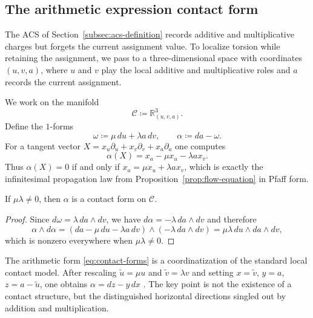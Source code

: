 
\subsection{The arithmetic expression contact form}\label{subsec:contact-form}

The ACS of Section~\ref{subsec:acs-definition} records additive and multiplicative charges but forgets the current assignment value. To localize torsion while retaining the assignment, we pass to a three-dimensional space with coordinates $(u,v,a)$, where $u$ and $v$ play the local additive and multiplicative roles and $a$ records the current assignment.

We work on the manifold
\[
\mathcal{C}\coloneqq \mathbb{R}^3_{(u,v,a)}.
\]
Define the $1$-forms
\begin{equation}\label{eq:contact-forms}
\omega\coloneqq \mu\,du+\lambda a\,dv,
\qquad
\alpha\coloneqq da-\omega.
\end{equation}
For a tangent vector $X=x_u\partial_u+x_v\partial_v+x_a\partial_a$ one computes
\[
\alpha(X)=x_a-\mu x_u-\lambda a x_v.
\]
Thus $\alpha(X)=0$ if and only if $x_a=\mu x_u+\lambda a x_v$, which is exactly the infinitesimal propagation law from Proposition~\ref{prop:flow-equation} in Pfaff form.

\begin{proposition}\label{prop:contact-form}
If $\mu\lambda\neq 0$, then $\alpha$ is a contact form on $\mathcal{C}$.
\end{proposition}

\begin{proof}
Since $d\omega=\lambda\,da\wedge dv$, we have $d\alpha=-\lambda\,da\wedge dv$ and therefore
\[
\alpha\wedge d\alpha
=(da-\mu\,du-\lambda a\,dv)\wedge(-\lambda\,da\wedge dv)
=\mu\lambda\,du\wedge da\wedge dv,
\]
which is nonzero everywhere when $\mu\lambda\neq 0$.
\end{proof}

The arithmetic form \eqref{eq:contact-forms} is a coordinatization of the standard local contact model. After rescaling $\tilde u=\mu u$ and $\tilde v=\lambda v$ and setting $x=\tilde v$, $y=a$, $z=a-\tilde u$, one obtains $\alpha=dz-y\,dx$ \cite{Darboux1882Pfaff,Geiges2008IntroContact}. The key point is not the existence of a contact structure, but the distinguished horizontal directions singled out by addition and multiplication.

